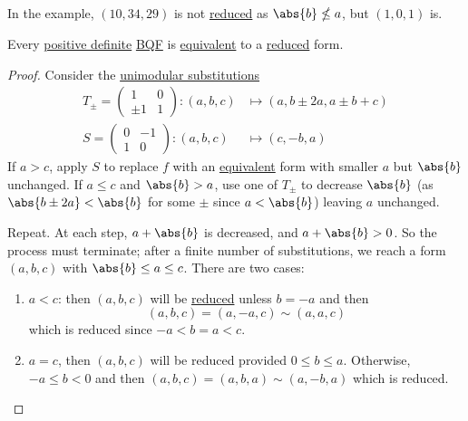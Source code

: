 \documentclass{article}
\begin{document}
In the example, $(10, 34, 29)$ is not \hyperlink{def:reduced}{reduced} as $\abs{b} \nleq a$, but $(1, 0, 1)$ is.

\begin{nlemma}\label{lem:4.5}
    Every \hyperlink{def:definite}{positive definite} \hyperlink{def:bqf}{BQF} is \hyperlink{def:uniSub}{equivalent} to a \hyperlink{def:reduced}{reduced} form.
\end{nlemma}

\begin{proof}
    Consider the \hyperlink{def:uniSub}{unimodular substitutions}
    \begin{align*}
        T_\pm = \begin{pmatrix} 1 & 0 \\ \pm 1 & 1 \end{pmatrix} : (a, b, c) &\longmapsto (a, b \pm 2a, a \pm b + c) \\
        S = \begin{pmatrix} 0 & -1 \\ 1 & 0 \end{pmatrix} : (a, b, c) &\longmapsto (c, -b, a)
    \end{align*}
    If $a > c$, apply $S$ to replace $f$ with an \hyperlink{def:uniSub}{equivalent} form with smaller $a$ but $\abs{b}$ unchanged.
    If $a \leq c$ and $\abs{b} > a$, use one of $T_\pm$ to decrease $\abs{b}$ (as $\abs{b \pm 2a} < \abs{b}$ for some $\pm$ since $a < \abs{b}$) leaving $a$ unchanged.

    Repeat. At each step, $a + \abs{b}$ is decreased, and $a + \abs{b} > 0$.
    So the process must terminate; after a finite number of substitutions, we reach a form $(a, b, c)$ with $\abs{b} \leq a \leq c$.
    There are two cases:
    \begin{enumerate}[label=\alph*)]
        \item $a < c$: then $(a, b, c)$ will be \hyperlink{def:reduced}{reduced} unless $b = -a$ and then
            \begin{equation*}
                (a, b, c) = (a, -a, c) \sim (a, a, c)
            \end{equation*}
            which is reduced since $-a < b = a < c$.
        \item $a = c$, then $(a, b, c)$ will be reduced provided $0 \leq b \leq a$. Otherwise, $-a \leq b < 0$ and then $(a, b, c) = (a, b, a) \sim (a, -b, a)$ which is reduced. \qedhere
    \end{enumerate}
\end{proof}
\end{document}
